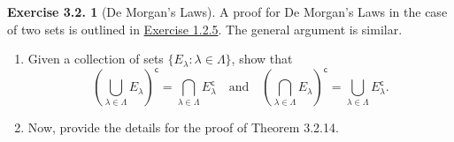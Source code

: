 \documentclass[12pt]{article}
\theoremstyle{definition}
\theoremstyle{exercise}
\newtheorem{exercise}{Exercise 3.2.}
\theoremstyle{solution}
\newcommand{\setcomp}[1]{#1^{\mathsf{c}}}
\newcommand{\quand}{\quad \text{and} \quad}
\begin{document}
\begin{exercise}[De Morgan's Laws]
\label{ex:9}
    A proof for De Morgan's Laws in the case of two sets is outlined in \href{https://lew98.github.io/Mathematics/UA_Section_1_2_Exercises.pdf}{Exercise 1.2.5}. The general argument is similar.
    \begin{enumerate}
        \item Given a collection of sets \( \{ E_{\lambda} : \lambda \in \Lambda \} \), show that
        \[
            \setcomp{\left( \bigcup_{\lambda \in \Lambda} E_{\lambda} \right)} = \bigcap_{\lambda \in \Lambda} \setcomp{E_{\lambda}} \quand \setcomp{\left( \bigcap_{\lambda \in \Lambda} E_{\lambda} \right)} = \bigcup_{\lambda \in \Lambda} \setcomp{E_{\lambda}}.
        \]

        \item Now, provide the details for the proof of Theorem 3.2.14.
    \end{enumerate}
\end{exercise}
\end{document}
